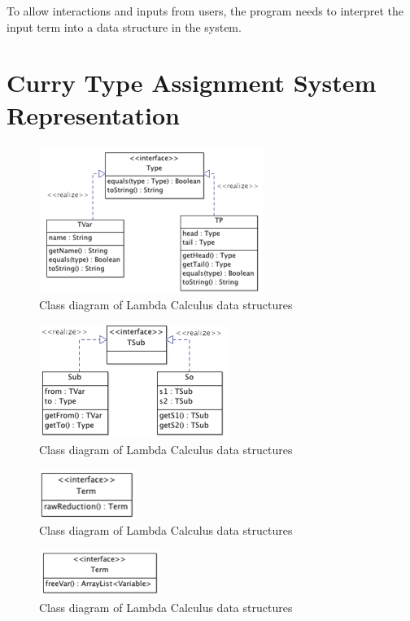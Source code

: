\documentclass[a4paper,11pt,twoside]{report}
\begin{document}
To allow interactions and inputs from users, the program needs to interpret the input term into a data structure in the system.  



\section{Curry Type Assignment System Representation}

\begin{figure}
\centering
\includegraphics[scale=0.7]{Type}
\caption{Class diagram of Lambda Calculus data structures}
\label{fig:term1}
\end{figure}


\begin{figure}
\centering
\includegraphics[scale=0.7]{TSub}
\caption{Class diagram of Lambda Calculus data structures}
\label{fig:term1}
\end{figure}


\begin{figure}
\centering
\includegraphics[scale=0.7]{TermRaw}
\caption{Class diagram of Lambda Calculus data structures}
\label{fig:term1}
\end{figure}


\begin{figure}
\centering
\includegraphics[scale=0.7]{TermType}
\caption{Class diagram of Lambda Calculus data structures}
\label{fig:term1}
\end{figure}
\end{document}
